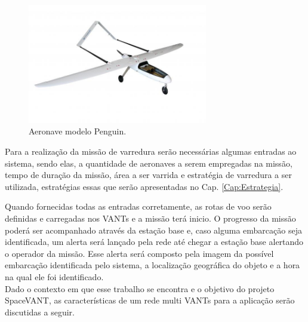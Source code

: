 \begin{figure} 
\center
\includegraphics[width=0.7\textwidth]{penguin.jpg}
\caption{Aeronave modelo Penguin.} 
\label{fig:penguin}
\end{figure}

Para a realização da missão de varredura serão necessárias algumas entradas ao sistema, sendo elas, a quantidade de aeronaves a serem empregadas na missão, tempo de duração da missão, área a ser varrida e estratégia de varredura a ser utilizada, estratégias essas que serão apresentadas no Cap. \ref{Cap:Estrategia}.

Quando fornecidas todas as entradas corretamente, as rotas de voo serão definidas e carregadas nos VANTs e a missão terá inicio. O progresso da missão poderá ser acompanhado através da estação base e, caso alguma embarcação seja identificada, um alerta será lançado pela rede até chegar a estação base alertando o operador da missão. Esse alerta será composto pela imagem da possível embarcação identificada pelo sistema, a localização geográfica do objeto e a hora na qual ele foi identificado.\\  

Dado o contexto em que esse trabalho se encontra e o objetivo do projeto SpaceVANT, as características de um rede multi VANTs para a aplicação serão discutidas a seguir.





 